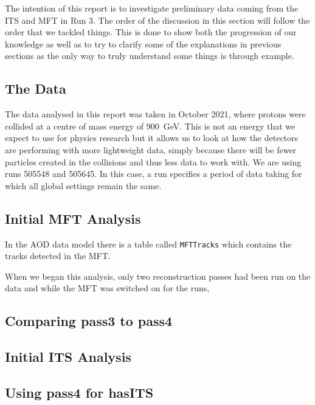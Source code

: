 The intention of this report is to investigate preliminary data coming from the ITS and MFT in Run 3. The order of the discussion in this section will follow the order that we tackled things. This is done to show both the progression of our knowledge as well as to try to clarify some of the explanations in previous sections as the only way to truly understand some things is through example. 

\subsection{The Data}
The data analysed in this report was taken in October 2021, where protons were collided at a centre of mass energy of \SI{900}{\giga\electronvolt}. This is not an energy that we expect to use for physics research but it allows us to look at how the detectors are performing with more lightweight data, simply because there will be fewer particles created in the collisions and thus less data to work with. We are using runs 505548 and 505645. In this case, a run specifies a period of data taking for which all global settings remain the same. 



\subsection{Initial MFT Analysis}
In the AOD data model there is a table called \texttt{MFTTracks} which contains the tracks detected in the MFT. 

When we began this analysis, only two reconstruction passes had been run on the data and while the MFT was switched on for the runs, 

\subsection{Comparing pass3 to pass4}


\subsection{Initial ITS Analysis}


\subsection{Using pass4 for hasITS}